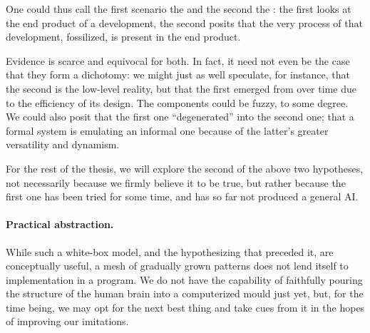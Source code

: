 One could thus call the first scenario the  and the second the : the first looks at the end product of a development, the second posits that the very process of that development, fossilized, is present in the end product.

Evidence is scarce and equivocal for both. In fact, it need not even be the case that they form a dichotomy: we might just as well speculate, for instance, that the second is the low-level reality, but that the first emerged from over time due to the efficiency of its design. The components could be fuzzy, to some degree. We could also posit that the first one ``degenerated'' into the second one; that a formal system is emulating an informal one because of the latter's greater versatility and dynamism.

For the rest of the thesis, we will explore the second of the above two hypotheses, not necessarily because we firmly believe it to be true, but rather because the first one has been tried for some time, and has so far not produced a general AI.

\paragraph{Practical abstraction.} While such a white-box model, and the hypothesizing that preceded it, are conceptually useful, a mesh of gradually grown patterns does not lend itself to implementation in a program. We do not have the capability of faithfully pouring the structure of the human brain into a computerized mould just yet, but, for the time being, we may opt for the next best thing and take cues from it in the hopes of improving our imitations.

